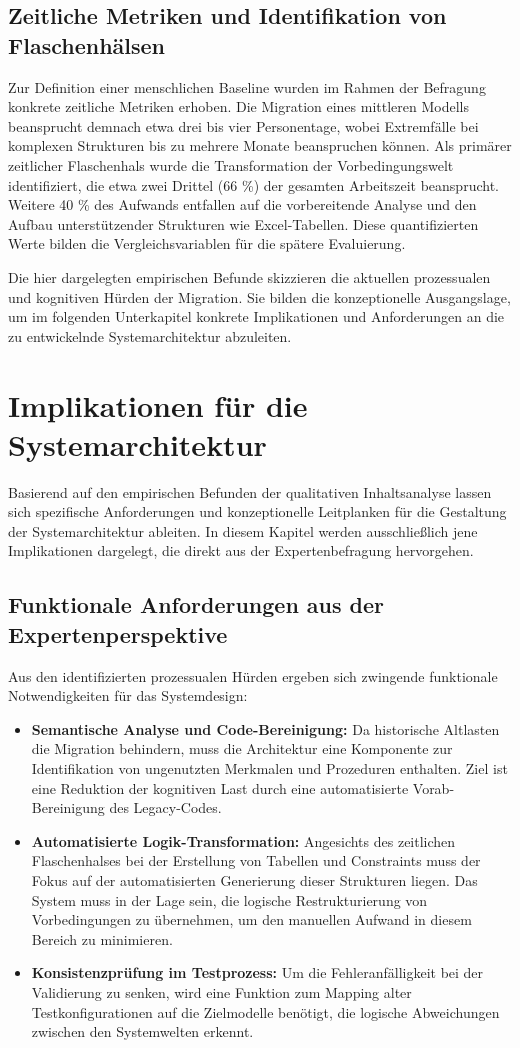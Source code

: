 \subsection{Zeitliche Metriken und Identifikation von Flaschenhälsen}
Zur Definition einer menschlichen Baseline wurden im Rahmen der Befragung konkrete zeitliche Metriken erhoben. Die Migration eines mittleren Modells beansprucht demnach etwa drei bis vier Personentage, wobei Extremfälle bei komplexen Strukturen bis zu mehrere Monate beanspruchen können. Als primärer zeitlicher Flaschenhals wurde die Transformation der Vorbedingungswelt identifiziert, die etwa zwei Drittel (66 \%) der gesamten Arbeitszeit beansprucht. Weitere 40 \% des Aufwands entfallen auf die vorbereitende Analyse und den Aufbau unterstützender Strukturen wie Excel-Tabellen. Diese quantifizierten Werte bilden die Vergleichsvariablen für die spätere Evaluierung.

Die hier dargelegten empirischen Befunde skizzieren die aktuellen prozessualen und kognitiven Hürden der Migration. Sie bilden die konzeptionelle Ausgangslage, um im folgenden Unterkapitel konkrete Implikationen und Anforderungen an die zu entwickelnde Systemarchitektur abzuleiten.
\section{Implikationen für die Systemarchitektur}
\label{sec:implikationen}
Basierend auf den empirischen Befunden der qualitativen Inhaltsanalyse lassen sich spezifische Anforderungen und konzeptionelle Leitplanken für die Gestaltung der Systemarchitektur ableiten. In diesem Kapitel werden ausschließlich jene Implikationen dargelegt, die direkt aus der Expertenbefragung hervorgehen.

\subsection{Funktionale Anforderungen aus der Expertenperspektive}
Aus den identifizierten prozessualen Hürden ergeben sich zwingende funktionale Notwendigkeiten für das Systemdesign:
\begin{itemize}
\item \textbf{Semantische Analyse und Code-Bereinigung:} Da historische Altlasten die Migration behindern, muss die Architektur eine Komponente zur Identifikation von ungenutzten Merkmalen und Prozeduren enthalten. Ziel ist eine Reduktion der kognitiven Last durch eine automatisierte Vorab-Bereinigung des Legacy-Codes.
\item \textbf{Automatisierte Logik-Transformation:} Angesichts des zeitlichen Flaschenhalses bei der Erstellung von Tabellen und Constraints muss der Fokus auf der automatisierten Generierung dieser Strukturen liegen. Das System muss in der Lage sein, die logische Restrukturierung von Vorbedingungen zu übernehmen, um den manuellen Aufwand in diesem Bereich zu minimieren.
\item \textbf{Konsistenzprüfung im Testprozess:} Um die Fehleranfälligkeit bei der Validierung zu senken, wird eine Funktion zum Mapping alter Testkonfigurationen auf die Zielmodelle benötigt, die logische Abweichungen zwischen den Systemwelten erkennt.
\end{itemize}

